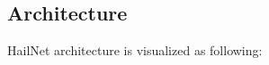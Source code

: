 \documentclass{article}
\begin{document}
\subsection{Architecture}
HailNet architecture is visualized as following:
\begin{figure}[h]
\end{figure}
\end{document}
